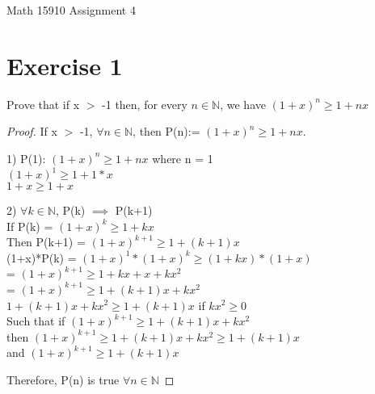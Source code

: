 \documentclass[12pt]{article}
\theoremstyle{definition}
\numberwithin{equation}{subsection}
\begin{document}
\pagestyle{plain}



\begin{center}
{\large Math 15910 Assignment 4} \\ 
\vspace{.2in}  
\end{center}



\section{Exercise 1}
Prove that if x $>$ -1 then, for every $n \in \mathbb{N}$, we have $(1+x)^n \geq 1 + nx$

\begin{proof}
If x $>$ -1, $\forall n \in \mathbb{N}$, then P(n):= $(1+x)^n \geq 1 + nx$.

1) P(1): $(1+x)^n \geq 1 + nx$ where n = 1
\\ $(1+x)^1 \geq 1+1*x$
\\ $1+x \geq 1+x$

2) $\forall k \in \mathbb{N}$, P(k) $\implies$ P(k+1)
\\ If P(k) = $(1+x)^k \geq 1 + kx$
\\ Then P(k+1) = $(1+x)^{k+1} \geq 1 + (k+1)x$
\\ (1+x)*P(k) = $(1+x)^1*(1+x)^k \geq (1+kx)*(1+x)$
\\  = $(1+x)^{k+1} \geq 1 + kx + x + kx^2$
\\  = $(1+x)^{k+1} \geq 1 + (k+1)x + kx^2$
\\ $1 + (k+1)x + kx^2 \geq 1 + (k+1)x$ if $kx^2 \geq 0$
\\ Such that if $(1+x)^{k+1} \geq 1 + (k+1)x + kx^2$
\\ then $(1+x)^{k+1} \geq 1 + (k+1)x + kx^2 \geq 1 + (k+1)x$
\\ and $(1+x)^{k+1} \geq 1 + (k+1)x$

Therefore, P(n) is true $\forall n \in \mathbb{N}$
\end{proof}
\end{document}
